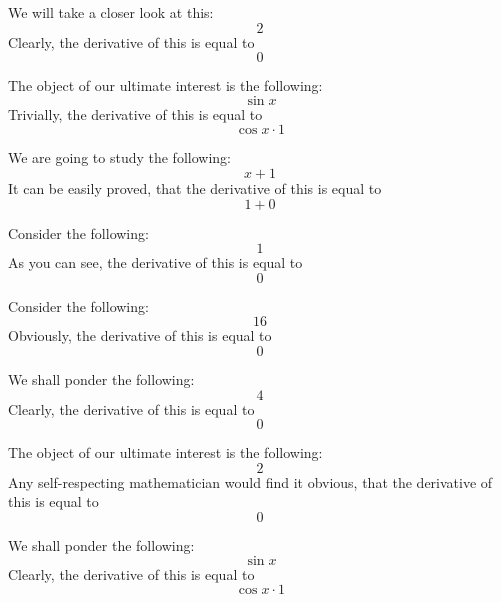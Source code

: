 \documentclass{article}
\begin{document}
We will take a closer look at this:
\begin{equation}
2 
\end{equation}
Clearly, the derivative of this is equal to
\begin{equation}
0 
\end{equation}

The object of our ultimate interest is the following:
\begin{equation}
\sin x 
\end{equation}
Trivially, the derivative of this is equal to
\begin{equation}
\cos x \cdot 1 
\end{equation}

We are going to study the following:
\begin{equation}
x + 1 
\end{equation}
It can be easily proved, that the derivative of this is equal to
\begin{equation}
1 + 0 
\end{equation}

Consider the following:
\begin{equation}
1 
\end{equation}
As you can see, the derivative of this is equal to
\begin{equation}
0 
\end{equation}

Consider the following:
\begin{equation}
16 
\end{equation}
Obviously, the derivative of this is equal to
\begin{equation}
0 
\end{equation}

We shall ponder the following:
\begin{equation}
4 
\end{equation}
Clearly, the derivative of this is equal to
\begin{equation}
0 
\end{equation}

The object of our ultimate interest is the following:
\begin{equation}
2 
\end{equation}
Any self-respecting mathematician would find it obvious, that the derivative of this is equal to
\begin{equation}
0 
\end{equation}

We shall ponder the following:
\begin{equation}
\sin x 
\end{equation}
Clearly, the derivative of this is equal to
\begin{equation}
\cos x \cdot 1 
\end{equation}
\end{document}
